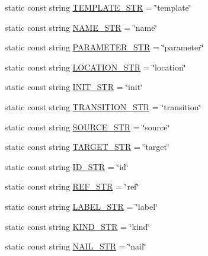 \begin{DoxyCompactItemize}
\item 
static const string \mbox{\hyperlink{namespacegraphsat_ad58215ae51e4a52e548b915a55daf446}{T\+E\+M\+P\+L\+A\+T\+E\+\_\+\+S\+TR}} = \char`\"{}template\char`\"{}
\item 
static const string \mbox{\hyperlink{namespacegraphsat_a52578cd35028ef76cc626229d26d7924}{N\+A\+M\+E\+\_\+\+S\+TR}} = \char`\"{}name\char`\"{}
\item 
static const string \mbox{\hyperlink{namespacegraphsat_a47ec61f2ceb3df10841ee322dc9fe5f6}{P\+A\+R\+A\+M\+E\+T\+E\+R\+\_\+\+S\+TR}} = \char`\"{}parameter\char`\"{}
\item 
static const string \mbox{\hyperlink{namespacegraphsat_aa4ffc093cd1401fd80561e8aed5778b7}{L\+O\+C\+A\+T\+I\+O\+N\+\_\+\+S\+TR}} = \char`\"{}location\char`\"{}
\item 
static const string \mbox{\hyperlink{namespacegraphsat_af901a3b7388a34ac26184d7dd224b5fd}{I\+N\+I\+T\+\_\+\+S\+TR}} = \char`\"{}init\char`\"{}
\item 
static const string \mbox{\hyperlink{namespacegraphsat_a73a00bd8e7948aad8a91346761d0a4d5}{T\+R\+A\+N\+S\+I\+T\+I\+O\+N\+\_\+\+S\+TR}} = \char`\"{}transition\char`\"{}
\item 
static const string \mbox{\hyperlink{namespacegraphsat_ac72730c9e15cf0dd2f8c9f341066b6d1}{S\+O\+U\+R\+C\+E\+\_\+\+S\+TR}} = \char`\"{}source\char`\"{}
\item 
static const string \mbox{\hyperlink{namespacegraphsat_a17fe04763d05d29d24f2e61f96b294fc}{T\+A\+R\+G\+E\+T\+\_\+\+S\+TR}} = \char`\"{}target\char`\"{}
\item 
static const string \mbox{\hyperlink{namespacegraphsat_a48f2be54f26130886b01b4085c188058}{I\+D\+\_\+\+S\+TR}} = \char`\"{}id\char`\"{}
\item 
static const string \mbox{\hyperlink{namespacegraphsat_a4cb9db90e5a0eecd58c2a948bbad7694}{R\+E\+F\+\_\+\+S\+TR}} = \char`\"{}ref\char`\"{}
\item 
static const string \mbox{\hyperlink{namespacegraphsat_a86ba01f0d1130dda6ab1afa5b20874ba}{L\+A\+B\+E\+L\+\_\+\+S\+TR}} = \char`\"{}label\char`\"{}
\item 
static const string \mbox{\hyperlink{namespacegraphsat_a2d24b1f6e55d968ea2bb0db15371a1b2}{K\+I\+N\+D\+\_\+\+S\+TR}} = \char`\"{}kind\char`\"{}
\item 
static const string \mbox{\hyperlink{namespacegraphsat_aae4b90aa756b13a2c16ab27c2046d966}{N\+A\+I\+L\+\_\+\+S\+TR}} = \char`\"{}nail\char`\"{}
\item 

\end{DoxyCompactItemize}
